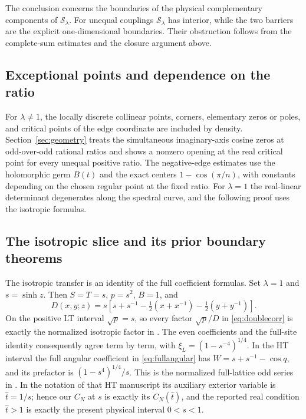 \documentclass[11pt]{article}
\numberwithin{equation}{section}
\theoremstyle{definition}
\newcommand{\cS}{\mathcal S}
\begin{document}
The conclusion concerns the boundaries of the physical complementary
components of $\cS_\lambda$. For unequal couplings $\cS_\lambda$ has
interior, while the two barriers are the explicit one-dimensional
boundaries. Their obstruction follows from the complete-sum estimates
and the closure argument above.

\subsection{Exceptional points and dependence on the ratio}
For $\lambda\ne1$, the locally discrete collinear points, corners,
elementary zeros or poles, and critical points of the edge coordinate
are included by density. Section~\ref{sec:geometry} treats the
simultaneous imaginary-axis cosine zeros at odd-over-odd rational
ratios and shows a nonzero opening at the real critical point for
every unequal positive ratio. The negative-edge estimates use the
holomorphic germ $B(t)$ and the exact centers $1-\cos(\pi/n)$, with
constants depending on the chosen regular point at the fixed ratio.
For $\lambda=1$ the real-linear determinant degenerates along the
spectral curve, and the following proof uses the isotropic formulas.

\subsection{The isotropic slice and its prior boundary theorems}
The isotropic transfer is an identity of the full coefficient formulas. Set
$\lambda=1$ and $s=\sinh z$. Then $S=T=s$, $p=s^2$, $B=1$, and
\[
 D(x,y;z)=s\left[s+s^{-1}
                  -\tfrac12(x+x^{-1})-\tfrac12(y+y^{-1})\right].
\]
On the positive LT interval $\sqrt p=s$, so every factor
$\sqrt p/D$ in \eqref{eq:doublecorr} is exactly the normalized
isotropic factor in \cite{LTsource}. The even coefficients and the
full-site identity consequently agree term by term, with
$\xi_L=(1-s^{-4})^{1/4}$. In the HT interval the full angular coefficient
in \eqref{eq:fullangular} has $W=s+s^{-1}-\cos q$, and its prefactor
is $(1-s^4)^{1/4}/s$. This is the normalized full-lattice odd series
in \cite{HTsource}.
In the notation of that HT manuscript its auxiliary exterior variable
is $\widehat t=1/s$; hence our $C_N$ at $s$ is exactly its
$C_N(\widehat t)$, and the reported real condition $\widehat t>1$
is exactly the present physical interval $0<s<1$.
\end{document}
